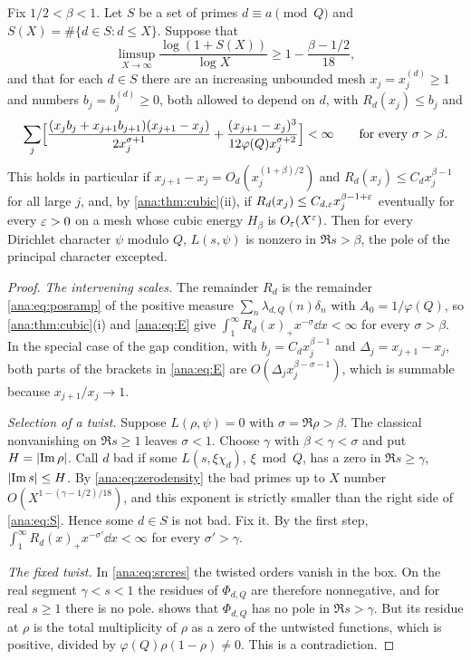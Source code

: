 \begin{theorem}\label{ana:thm:sparse}
Fix $1/2<\beta<1$. Let $S$ be a set of primes $d\equiv a\pmod Q$ and
$S(X)=\#\{d\in S:d\le X\}$. Suppose that
\begin{equation}\label{ana:eq:S}
 \limsup_{X\to\infty}\frac{\log(1+S(X))}{\log X}\ge1-\frac{\beta-1/2}{18},
\end{equation}
and that for each $d\in S$ there are an increasing unbounded mesh $x_j=x_j^{(d)}\ge1$ and
numbers $b_j=b_j^{(d)}\ge0$, both allowed to depend on $d$, with $R_d(x_j)\le b_j$ and
\begin{equation}\label{ana:eq:E}
 \sum_j\Bigl[\frac{(x_jb_j+x_{j+1}b_{j+1})(x_{j+1}-x_j)}{2x_j^{\sigma+1}}
 +\frac{(x_{j+1}-x_j)^3}{12\varphi(Q)x_j^{\sigma+2}}\Bigr]<\infty\qquad
 \text{for every }\sigma>\beta .
\end{equation}
This holds in particular if $x_{j+1}-x_j=O_d(x_j^{(1+\beta)/2})$ and
$R_d(x_j)\le C_dx_j^{\beta-1}$ for all large $j$, and, by \cref{ana:thm:cubic}(ii), if
$R_d(x_j)\le C_{d,\varepsilon}x_j^{\beta-1+\varepsilon}$ eventually for every $\varepsilon>0$ on a mesh whose cubic
energy $H_\beta$ is $O_\varepsilon(X^\varepsilon)$. Then for every Dirichlet character $\psi$ modulo $Q$,
$L(s,\psi)$ is nonzero in $\Re s>\beta$, the pole of the principal character excepted.
\end{theorem}

\begin{proof}
\emph{The intervening scales.} The remainder $R_d$ is the remainder \eqref{ana:eq:posramp} of the
positive measure $\sum_n\lambda_{d,Q}(n)\delta_n$ with $A_0=1/\varphi(Q)$, so
\cref{ana:thm:cubic}(i) and \eqref{ana:eq:E} give
$\int_1^\infty R_d(x)_+x^{-\sigma}\dd x<\infty$ for every $\sigma>\beta$. In the special case
of the gap condition, with $b_j=C_dx_j^{\beta-1}$ and $\Delta_j=x_{j+1}-x_j$, both parts of
the brackets in \eqref{ana:eq:E} are $O(\Delta_jx_j^{\beta-\sigma-1})$, which is summable
because $x_{j+1}/x_j\to1$.

\emph{Selection of a twist.} Suppose $L(\rho,\psi)=0$ with $\sigma=\Re\rho>\beta$. The
classical nonvanishing on $\Re s\ge1$ leaves $\sigma<1$. Choose $\gamma$ with
$\beta<\gamma<\sigma$ and put $H=\lvert\operatorname{Im}\rho\rvert$. Call $d$ bad if some $L(s,\xi\chi_d)$,
$\xi\bmod Q$, has a zero in $\Re s\ge\gamma$, $\lvert\operatorname{Im} s\rvert\le H$. By
\eqref{ana:eq:zerodensity} the bad primes up to $X$ number $O(X^{1-(\gamma-1/2)/18})$, and this
exponent is strictly smaller than the right side of \eqref{ana:eq:S}. Hence some $d\in S$ is
not bad. Fix it. By the first step, $\int_1^\infty R_d(x)_+x^{-\sigma'}\dd x<\infty$ for every
$\sigma'>\gamma$.

\emph{The fixed twist.} In \eqref{ana:eq:srcres} the twisted orders vanish in the box. On the
real segment $\gamma<s<1$ the residues of $\Phi_{d,Q}$ are therefore nonnegative, and for real
$s\ge1$ there is no pole.  shows that $\Phi_{d,Q}$ has no pole in
$\Re s>\gamma$. But its residue at $\rho$ is the total multiplicity
of $\rho$ as a zero of the untwisted functions, which is positive, divided by
$\varphi(Q)\rho(1-\rho)\ne0$. This is a contradiction.
\end{proof}

